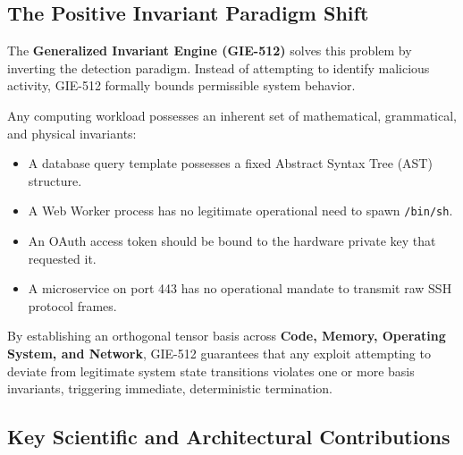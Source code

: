\documentclass{portalciencia}
\theoremstyle{plain}
\theoremstyle{definition}
\begin{document}
\subsection{The Positive Invariant Paradigm Shift}

The \textbf{Generalized Invariant Engine (GIE-512)} solves this problem by inverting the detection paradigm. Instead of attempting to identify malicious activity, GIE-512 formally bounds permissible system behavior.

Any computing workload possesses an inherent set of mathematical, grammatical, and physical invariants:
\begin{itemize}
  \item A database query template possesses a fixed Abstract Syntax Tree (AST) structure.
  \item A Web Worker process has no legitimate operational need to spawn \texttt{/bin/sh}.
  \item An OAuth access token should be bound to the hardware private key that requested it.
  \item A microservice on port 443 has no operational mandate to transmit raw SSH protocol frames.
\end{itemize}

By establishing an orthogonal tensor basis across \textbf{Code, Memory, Operating System, and Network}, GIE-512 guarantees that any exploit attempting to deviate from legitimate system state transitions violates one or more basis invariants, triggering immediate, deterministic termination.

\subsection{Key Scientific and Architectural Contributions}
\end{document}
